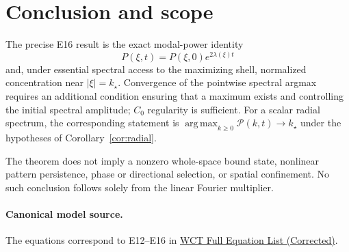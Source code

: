 \documentclass[11pt]{article}
\theoremstyle{remark}
\newcommand{\abs}[1]{\left\lvert#1\right\rvert}
\DeclareMathOperator*{\argmax}{arg\,max}
\begin{document}
\section{Conclusion and scope}
The precise E16 result is the exact modal-power identity
\[
 \boxed{P(\xi,t)=P(\xi,0)e^{2\lambda(\xi)t}}
\]
and, under essential spectral access to the maximizing shell,
normalized concentration near $\abs\xi=k_\star$.
Convergence of the pointwise spectral argmax requires an additional
condition ensuring that a maximum exists and controlling the
initial spectral amplitude; $C_0$ regularity is sufficient.
For a scalar radial spectrum, the corresponding statement is
$\argmax_{k\ge0}\mathscr P(k,t)\to k_\star$ under the hypotheses
of Corollary~\ref{cor:radial}.

The theorem does not imply a nonzero whole-space bound state,
nonlinear pattern persistence, phase or directional selection,
or spatial confinement. No such conclusion follows solely from the
linear Fourier multiplier.

\paragraph{Canonical model source.}
The equations correspond to E12--E16 in
\href{https://github.com/rickyjreyes/geometry_of_resonance/blob/main/WCT_FULL_EQUATION_LIST_CORRECTED.md}{WCT Full Equation List (Corrected)}.
\end{document}

